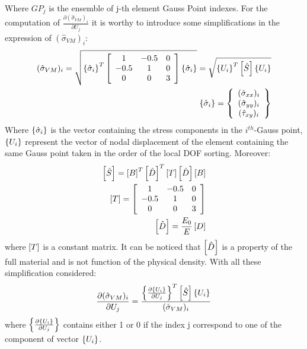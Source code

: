 Where $GP_j$ is the ensemble of j-th element Gauss Point indexes. For the computation of $\frac{\partial (\hat{\sigma}_{VM})_i} {\partial U_j}$ it is worthy to introduce some simplifications in the expression of $(\hat{\sigma}_{VM})_i$:
\begin{eqnarray}
(\hat{\sigma}_{VM})_i=\sqrt{\left\lbrace{\hat{\sigma}_i}\right \rbrace^T \left[{\begin{array}{ccc}
1 & -0.5 & 0\\
-0.5 & 1 & 0\\
0 & 0 & 3
\end{array}}\right]\left\lbrace{\hat{\sigma}_i}\right \rbrace}=\sqrt{\left\lbrace{U_i}\right \rbrace^T \left[{\hat{S}}\right]\left\lbrace{U_i}\right \rbrace}\\
\left\lbrace{\hat{\sigma}_i}\right \rbrace=\left\lbrace{\begin{array}{c}
(\hat{\sigma}_{xx})_i\\
(\hat{\sigma}_{yy})_i\\
(\hat{\tau}_{xy})_i
\end{array}}\right \rbrace
\end{eqnarray}
Where $\left\lbrace{\hat{\sigma}_i}\right \rbrace$ is the vector containing the stress components in the $i^{th}$-Gauss point, $\left\lbrace{U_i}\right \rbrace$ represent the vector of nodal displacement of the element containing the same Gauss point taken in the order of the local DOF sorting. Moreover:
\begin{eqnarray}
\left[{\hat{S}}\right]=\left[{B}\right]^T\left[{\hat{D}}\right]^T\left[{T}\right]\left[{\hat{D}}\right]\left[{B}\right]\\
\left[{T}\right]=\left[{\begin{array}{ccc}
1 & -0.5 & 0\\
-0.5 & 1 & 0\\
0 & 0 & 3
\end{array}}\right]\\
\left[{\hat{D}}\right]=\frac{E_0}{E}\left[{D}\right]
\end{eqnarray}
where $\left[{T}\right]$ is a constant matrix. It can be noticed that $\left[{\hat{D}}\right]$ is a property of the full material and is not function of the physical density.
With all these simplification considered:
\begin{equation}
\frac{\partial (\hat{\sigma}_{VM})_i} {\partial U_j}=\frac{\left\lbrace{\frac{\partial \ensuremath\left\lbrace{U_i}\right \rbrace}{\partial U_j}}\right \rbrace^T\left[{\hat{S}}\right]\left\lbrace{U_i}\right \rbrace }{(\hat{\sigma}_{VM})_i}
\end{equation}
where $\left\lbrace{\frac{\partial \ensuremath\left\lbrace{U_i}\right \rbrace}{\partial U_j}}\right \rbrace$ contains either 1 or 0 if the index j correspond to one of the component of vector $ \left\lbrace{U_i}\right \rbrace$. 

